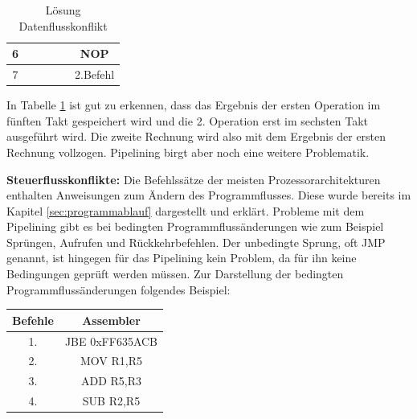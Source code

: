 \documentclass[12pt]{article}
\begin{document}
\begin{table}[!htb]
\begin{tabular}{|c|c|c|c|c|c|}
6    &                                                            &                                                              &                                                               & \cellcolor[HTML]{9AFF99}{\color[HTML]{333333} \textbf{2.Befehl}} & NOP                                                               \\ \hline
7    &                                                            &                                                              &                                                               &                                                                  & 2.Befehl                                                          \\ \hline
\end{tabular}
\caption{Lösung Datenflusskonflikt}
\label{tab:Datenflusskonfliktloesung}
\end{table}

\noindent In Tabelle \ref{tab:Datenflusskonfliktloesung} ist gut zu erkennen, dass das Ergebnis der ersten Operation im fünften Takt gespeichert wird und die 2. Operation erst im sechsten Takt ausgeführt wird. Die zweite Rechnung wird also mit dem Ergebnis der ersten Rechnung vollzogen. Pipelining birgt aber noch eine weitere Problematik.

\par\bigskip\noindent \textbf{Steuerflusskonflikte:} Die Befehlssätze der meisten Prozessorarchitekturen enthalten Anweisungen zum Ändern des Programmflusses. Diese wurde bereits im Kapitel \ref{sec:programmablauf} dargestellt und erklärt. Probleme mit dem Pipelining gibt es bei bedingten Programmflussänderungen wie zum Beispiel Sprüngen, Aufrufen und Rückkehrbefehlen. Der unbedingte Sprung, oft JMP genannt, ist hingegen für das Pipelining kein Problem, da für ihn keine Bedingungen geprüft werden müssen. Zur Darstellung der bedingten Programmflussänderungen folgendes Beispiel:


\begin{table}[!htb]
\centering
\begin{tabular}{|c|c|}
\hline
Befehle & Assembler      \\ \hline
1.      & JBE 0xFF635ACB \\ \hline
2.      & MOV R1,R5      \\ \hline
3.      & ADD R5,R3      \\ \hline
4.      & SUB R2,R5      \\ \hline
\end{tabular}
\end{table}
\end{document}
